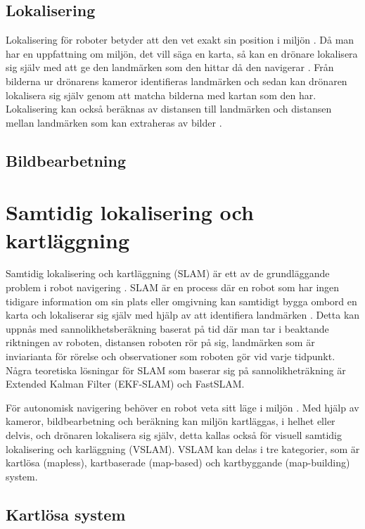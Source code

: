 \section{Lokalisering}

Lokalisering för roboter betyder att den vet exakt sin position i miljön \citep{982903}. Då man har en uppfattning om miljön, det vill säga en karta, så kan en drönare lokalisera sig själv med att ge den landmärken som den hittar då den navigerar \citep{982903}. Från bilderna ur drönarens kameror identifieras landmärken och sedan kan drönaren lokalisera sig själv genom att matcha bilderna med kartan som den har. Lokalisering kan också beräknas av distansen till landmärken och distansen mellan landmärken som kan extraheras av bilder \citep{realslamproblem}.

\section{Bildbearbetning}


\chapter{Samtidig lokalisering och kartläggning}

Samtidig lokalisering och kartläggning (SLAM) är ett av de grundläggande problem i robot navigering \citep{realslamproblem}. SLAM är en process där en robot som har ingen tidigare information om sin plats eller omgivning kan samtidigt bygga ombord en karta och lokaliserar sig själv med hjälp av att identifiera landmärken \citep{realslamproblem}. Detta kan uppnås med sannolikhetsberäkning baserat på tid där man tar i beaktande riktningen av roboten, distansen roboten rör på sig, landmärken som är inviarianta för rörelse och observationer som roboten gör vid varje tidpunkt. Några teoretiska lösningar för SLAM som baserar sig på sannolikheträkning är Extended Kalman Filter (EKF-SLAM) och FastSLAM. 

För autonomisk navigering behöver en robot veta sitt läge i miljön \citep{geospatial}. Med hjälp av kameror, bildbearbetning och beräkning kan miljön kartläggas, i helhet eller delvis, och drönaren lokalisera sig själv, detta kallas också för visuell samtidig lokalisering och karläggning (VSLAM). VSLAM kan delas i tre kategorier, som är kartlösa (mapless), kartbaserade (map-based) och kartbyggande (map-building) system. 

\section{Kartlösa system}

